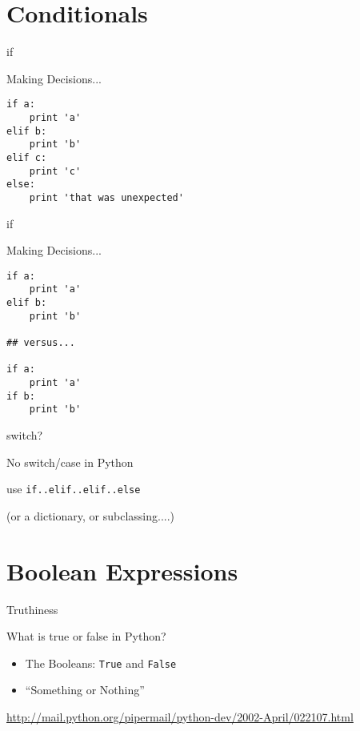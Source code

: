 \documentclass{beamer}
\begin{document}
\section{Conditionals}

\begin{frame}[fragile]{if}

{\Large Making Decisions...}
\begin{verbatim}
if a:
    print 'a'
elif b:
    print 'b'
elif c:
    print 'c'
else:
    print 'that was unexpected'
\end{verbatim}

\end{frame}


\begin{frame}[fragile]{if}

{\Large Making Decisions...}
\begin{verbatim}
if a:
    print 'a'
elif b:
    print 'b'

## versus...

if a:
    print 'a'
if b:
    print 'b'
\end{verbatim}

\end{frame}

\begin{frame}[fragile]{switch?}

\vfill
{\Large No switch/case in Python}

\vfill
{\Large use \verb|if..elif..elif..else|}

\vfill

(or a dictionary, or subclassing....)
\end{frame}

%
%
%
%
%

\section{Boolean Expressions}

\begin{frame}[fragile]{Truthiness}

{\Large What is true or false in Python?}

\begin{itemize}
  \item The Booleans: \verb+True+ and \verb+False+
  \item ``Something or Nothing''
\end{itemize}

{\small \url{http://mail.python.org/pipermail/python-dev/2002-April/022107.html} }

\end{frame}
\end{document}
